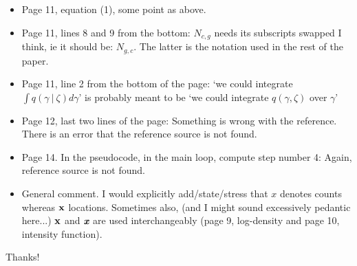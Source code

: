 \documentclass[12pt]{article}
\newcommand\givenbase[1][]{\:#1\lvert\:}
\let\given\givenbase
\begin{document}
\begin{itemize}
     \item Page 11, equation (1), some point as above.

     \item Page 11,  lines 8 and 9 from the bottom: $N_{c,g}$ needs its subscripts swapped I think, ie it should be: $N_{g,c}$.  The latter is the notation used in the rest of the paper.

    \item Page 11, line 2 from the bottom of the page: `we could integrate $\int q(\gamma \given \zeta) d\gamma$' is probably meant to be `we could integrate $q(\gamma, \zeta)$ over $\gamma$'

    \item Page 12, last two lines of the page: Something is wrong with the reference. There is an error that the reference source is not found.

   \item Page 14. In the pseudocode, in the main loop, compute step number 4: Again, reference source is not found. 

   \item General comment. I would explicitly add/state/stress that $x$ denotes counts whereas ${\bf x}$ locations. Sometimes also, (and I might sound excessively pedantic here...) ${\bf x}$ and  $\textit{\textbf{x}}$ are used interchangeably (page 9, log-density and page 10, intensity function).

%

\end{itemize}
Thanks!
\end{document}
